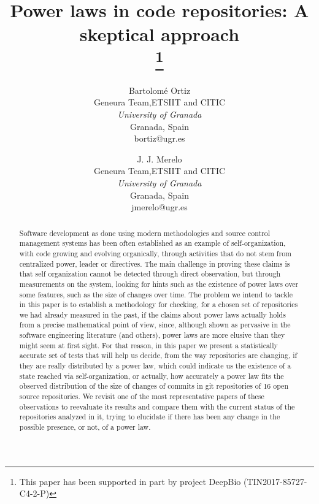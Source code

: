 \documentclass{article}
\begin{document}
\title{Power laws in code repositories: A skeptical approach\\
  \thanks{This paper has been supported in part by project DeepBio
    (TIN2017-85727-C4-2-P)} }

\author{ Bartolom\'{e} Ortiz\\
  Geneura Team,ETSIIT and CITIC \\
    \textit{University of Granada}\\
    Granada, Spain \\
    bortiz@ugr.es
  \and
  J. J. Merelo\\
  Geneura Team,ETSIIT and CITIC \\
    \textit{University of Granada}\\
    Granada, Spain \\
    jmerelo@ugr.es}

\maketitle

\begin{abstract}
  
  Software development as done using modern methodologies and source
  control management systems has been often established as an example of
  self-organization, with code growing and evolving organically,
  through activities that do not stem from centralized power, leader
  or directives.  The main challenge in proving these claims is that
  self organization cannot be detected through direct observation, but
  through measurements on the system, looking for hints such as the
  existence of power laws over some features, such as the size of
  changes over time.  The problem we intend to tackle in this paper is to establish a methodology for checking, for a chosen set of repositories we had already measured
  in the past, if the claims about power laws actually holds from a
  precise mathematical point of view, since, although shown as
  pervasive in the software engineering literature (and others), power
  laws are more elusive than they might seem at first sight. For that
  reason, in this paper we present a statistically accurate set of
  tests that will help us decide, from the way repositories are
  changing, if they are really distributed by a power law, which could
  indicate us the existence of a state reached via self-organization,
  or actually, how accurately a power law fits the observed
  distribution of the size of changes of commits in git repositories
  of 16 open source repositories.  We revisit one of the most
  representative papers of these observations to reevaluate its
  results and compare them with the current status of the repositories
  analyzed in it, trying to elucidate if there has been any change in
  the possible presence, or not, of a power law.

\end{abstract}
\end{document}

